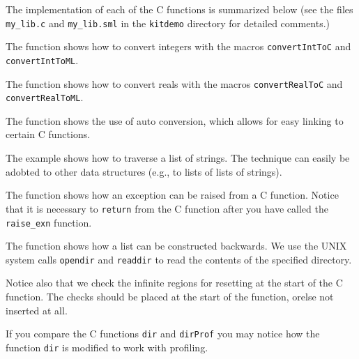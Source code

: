 \documentclass[12pt]{book}
\begin{document}
The implementation of each of the C functions is summarized below (see
the files \verb|my_lib.c| and \verb|my_lib.sml| in the {\tt kitdemo}
directory for detailed comments.)

\begin{example}\label{power.ex}
  The  function shows how to convert
  integers with the macros \texttt{convertIntToC} and
  \texttt{convertIntToML}.
\end{example}

\begin{example}\label{power_real.ex}
  The  function shows how
  to convert reals with the macros \texttt{convertRealToC} and
  \texttt{convertRealToML}.
\end{example}

\begin{example}\label{power_auto.ex}
  The  function shows the
  use of auto conversion, which allows for easy linking to certain C
  functions.
\end{example}

\begin{example}\label{print_string_list.ex}
  The 
  example shows how to traverse a list of strings. The technique can
  easily be adobted to other data structures (e.g., to lists of lists
  of strings).
\end{example}

\begin{example}\label{power_exn.ex}
  The  function shows how an
  exception can be raised from a C function. Notice that it is
  necessary to {\tt return} from the C function after you have called
  the \verb|raise_exn| function.
\end{example}

\begin{example}\label{dir.ex}
  The  function shows how a list can be
  constructed backwards.  We use the UNIX system calls
  \texttt{opendir} and \texttt{readdir} to read the contents of the
  specified directory.
  
  Notice also that we check the infinite regions for resetting at the
  start of the C function. The checks should be placed at the start of
  the function, orelse not inserted at all.
  
  If you compare the C functions \texttt{dir} and \texttt{dirProf} you may
  notice how the function \texttt{dir} is modified to work with
  profiling.
\end{example}
\end{document}
